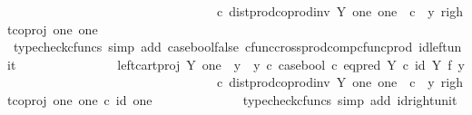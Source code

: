 \begin{isabellebody}
\ \ \ \ \ \ \ \ \ \ \ \ \ \ \ \ \ \ \ \ \ \ \ \ \ \ \ \ \ \ \ \ \ {\isasymcirc}\isactrlsub c\ dist{\isacharunderscore}{\kern0pt}prod{\isacharunderscore}{\kern0pt}coprod{\isacharunderscore}{\kern0pt}inv\ Y\ one\ one\ \ {\isasymcirc}\isactrlsub c\ \ {\isasymlangle}y{\isacharcomma}{\kern0pt}\ right{\isacharunderscore}{\kern0pt}coproj\ one\ one{\isasymrangle}{\isachardoublequoteclose}\isanewline
\ \ \ \ \ \ \ \ \ \ \ \ \isamarkupfalse%
\ {\isacharparenleft}{\kern0pt}typecheck{\isacharunderscore}{\kern0pt}cfuncs{\isacharcomma}{\kern0pt}\ simp\ add{\isacharcolon}{\kern0pt}\ case{\isacharunderscore}{\kern0pt}bool{\isacharunderscore}{\kern0pt}false\ cfunc{\isacharunderscore}{\kern0pt}cross{\isacharunderscore}{\kern0pt}prod{\isacharunderscore}{\kern0pt}comp{\isacharunderscore}{\kern0pt}cfunc{\isacharunderscore}{\kern0pt}prod\ id{\isacharunderscore}{\kern0pt}left{\isacharunderscore}{\kern0pt}unit{}{\isacharparenright}{\kern0pt}\isanewline
\ \ \ \ \ \ \ \ \ \ \isamarkupfalse%
\ \isamarkupfalse%
\ {\isachardoublequoteopen}{\isachardot}{\kern0pt}{\isachardot}{\kern0pt}{\isachardot}{\kern0pt}\ {\isacharequal}{\kern0pt}\ {\isacharparenleft}{\kern0pt}left{\isacharunderscore}{\kern0pt}cart{\isacharunderscore}{\kern0pt}proj\ Y\ one\ {\isasymamalg}\ {\isacharparenleft}{\kern0pt}{\isacharparenleft}{\kern0pt}y{}\ {\isasymamalg}\ y{}{\isacharparenright}{\kern0pt}\ {\isasymcirc}\isactrlsub c\ case{\isacharunderscore}{\kern0pt}bool\ {\isasymcirc}\isactrlsub c\ eq{\isacharunderscore}{\kern0pt}pred\ Y\ {\isasymcirc}\isactrlsub c\ {\isacharparenleft}{\kern0pt}id\ Y\ {\isasymtimes}\isactrlsub f\ y{}{\isacharparenright}{\kern0pt}{\isacharparenright}{\kern0pt}{\isacharparenright}{\kern0pt}\isanewline
\ \ \ \ \ \ \ \ \ \ \ \ \ \ \ \ \ \ \ \ \ \ \ \ \ \ \ \ \ \ \ \ \ {\isasymcirc}\isactrlsub c\ dist{\isacharunderscore}{\kern0pt}prod{\isacharunderscore}{\kern0pt}coprod{\isacharunderscore}{\kern0pt}inv\ Y\ one\ one\ \ {\isasymcirc}\isactrlsub c\ \ {\isasymlangle}y{\isacharcomma}{\kern0pt}\ right{\isacharunderscore}{\kern0pt}coproj\ one\ one\ {\isasymcirc}\isactrlsub c\ id\ one{\isasymrangle}{\isachardoublequoteclose}\isanewline
\ \ \ \ \ \ \ \ \ \ \ \ \isamarkupfalse%
\ {\isacharparenleft}{\kern0pt}typecheck{\isacharunderscore}{\kern0pt}cfuncs{\isacharcomma}{\kern0pt}\ simp\ add{\isacharcolon}{\kern0pt}\ id{\isacharunderscore}{\kern0pt}right{\isacharunderscore}{\kern0pt}unit{}{\isacharparenright}{\kern0pt}\isanewline
\ \ \ \ \ \ \ \ \ \ \isamarkupfalse%

\end{isabellebody}
